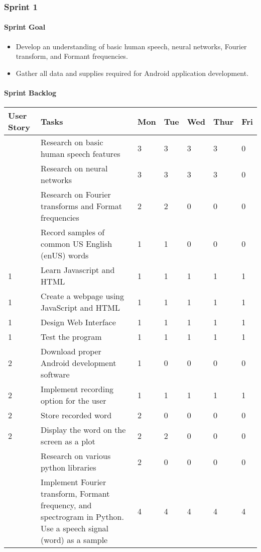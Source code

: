 \subsubsection{Sprint 1}

\paragraph{Sprint Goal}
\begin{itemize}
    \item  Develop an understanding of basic human speech, neural networks, Fourier transform, and Formant frequencies.
    \item  Gather all data and supplies required for Android application development.
\end{itemize}

\paragraph{Sprint Backlog}
\begin{tabular}[htbp]
    \centering
    \begin{tabularx}{\textwidth}{l|l|l|l|l|l|l}
        User Story & Tasks &    Mon & Tue & Wed & Thur & Fri\\
        \hline
        & Research on basic human speech features & 3 & 3 & 3 & 3 & 0\\
        & Research on neural networks & 3 & 3 & 3 & 3 & 0\\
        & Research on Fourier transforms and Format frequencies & 2 & 2 & 0 & 0 & 0\\
        & Record samples of common US English (enUS) words & 1 & 1 & 0 & 0 & 0\\
        1 & Learn Javascript and HTML & 1 & 1 & 1 & 1 & 1\\
        1 & Create a webpage using JavaScript and HTML & 1 & 1 & 1 & 1 & 1\\
        1 & Design Web Interface & 1 & 1 & 1 & 1 & 1\\
        1 & Test the program & 1 & 1 & 1 & 1 & 1\\
        2 & Download proper Android development software & 1 & 0 & 0 & 0 & 0\\
        2 & Implement recording option for the user & 1 & 1 & 1 & 1 & 1\\
        2 & Store recorded word & 2 & 0 & 0 & 0 & 0\\
        2 & Display the word on the screen as a plot & 2 & 2 & 0 & 0 & 0\\
        & Research on various python libraries & 2 & 0 & 0 & 0 & 0\\
        & Implement Fourier transform, Formant frequency, and spectrogram in Python. Use a speech signal (word) as a sample & 4 & 4 & 4 & 4 & 4\\
    \end{tabularx}
\end{tabular}
